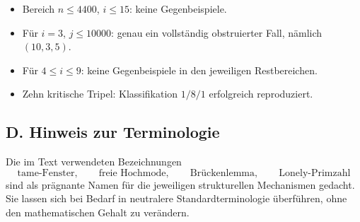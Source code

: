 \documentclass[12pt,a4paper]{article}
\theoremstyle{plain}
\theoremstyle{definition}
\theoremstyle{remark}
\begin{document}
	\begin{itemize}
		\item Bereich $n\le 4400$, $i\le 15$: keine Gegenbeispiele.
		\item Für $i=3$, $j\le 10000$: genau ein vollständig obstruierter Fall, nämlich $(10,3,5)$.
		\item Für $4\le i\le 9$: keine Gegenbeispiele in den jeweiligen Restbereichen.
		\item Zehn kritische Tripel: Klassifikation $1/8/1$ erfolgreich reproduziert.
	\end{itemize}
	
	\subsection*{D. Hinweis zur Terminologie}
	
	Die im Text verwendeten Bezeichnungen
	\[
	\text{tame-Fenster},\qquad
	\text{freie Hochmode},\qquad
	\text{Brückenlemma},\qquad
	\text{Lonely-Primzahl}
	\]
	sind als prägnante Namen für die jeweiligen strukturellen Mechanismen gedacht. 
	Sie lassen sich bei Bedarf in neutralere Standardterminologie überführen, ohne den mathematischen Gehalt zu verändern.
	
\end{document}
